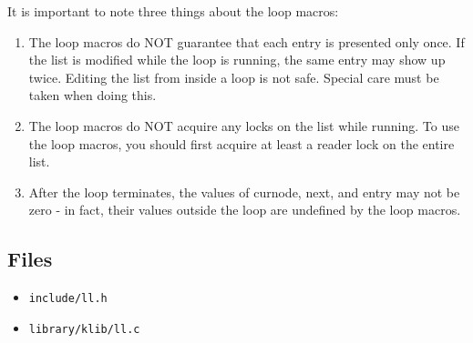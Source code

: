 It is important to note three things about the loop macros:
\begin{enumerate}
\item The loop macros do NOT guarantee that each entry is presented only once. If the list is modified
while the loop is running, the same entry may show up twice. Editing the list from inside a loop is not safe.
Special care must be taken when doing this.

\item The loop macros do NOT acquire any locks on the list while running. To use the loop macros, you should
first acquire at least a reader lock on the entire list.

\item After the loop terminates, the values of curnode, next, and entry may not be zero - in fact, 
their values outside the loop are undefined by the loop macros.
\end{enumerate}

\subsection{Files}
\begin{itemize}
\item \texttt{include/ll.h}
\item \texttt{library/klib/ll.c}
\end{itemize}
